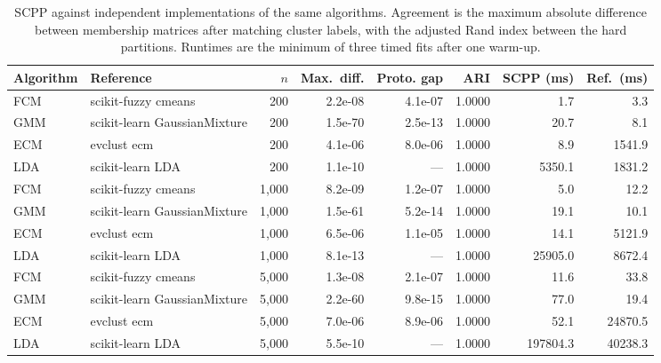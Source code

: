 \begin{table}[t]
\centering
\caption{SCPP against independent implementations of the same algorithms. Agreement is the maximum absolute difference between membership matrices after matching cluster labels, with the adjusted Rand index between the hard partitions. Runtimes are the minimum of three timed fits after one warm-up.}
\label{tab:external-baselines}
\begin{tabular}{llrrrrrr}
\toprule
Algorithm & Reference & $n$ & Max.\ diff. & Proto. gap & ARI & SCPP (ms) & Ref.\ (ms) \\
\midrule
FCM & scikit-fuzzy cmeans & 200 & 2.2e-08 & 4.1e-07 & 1.0000 & 1.7 & 3.3 \\
GMM & scikit-learn GaussianMixture & 200 & 1.5e-70 & 2.5e-13 & 1.0000 & 20.7 & 8.1 \\
ECM & evclust ecm & 200 & 4.1e-06 & 8.0e-06 & 1.0000 & 8.9 & 1541.9 \\
LDA & scikit-learn LDA & 200 & 1.1e-10 & --- & 1.0000 & 5350.1 & 1831.2 \\
FCM & scikit-fuzzy cmeans & 1,000 & 8.2e-09 & 1.2e-07 & 1.0000 & 5.0 & 12.2 \\
GMM & scikit-learn GaussianMixture & 1,000 & 1.5e-61 & 5.2e-14 & 1.0000 & 19.1 & 10.1 \\
ECM & evclust ecm & 1,000 & 6.5e-06 & 1.1e-05 & 1.0000 & 14.1 & 5121.9 \\
LDA & scikit-learn LDA & 1,000 & 8.1e-13 & --- & 1.0000 & 25905.0 & 8672.4 \\
FCM & scikit-fuzzy cmeans & 5,000 & 1.3e-08 & 2.1e-07 & 1.0000 & 11.6 & 33.8 \\
GMM & scikit-learn GaussianMixture & 5,000 & 2.2e-60 & 9.8e-15 & 1.0000 & 77.0 & 19.4 \\
ECM & evclust ecm & 5,000 & 7.0e-06 & 8.9e-06 & 1.0000 & 52.1 & 24870.5 \\
LDA & scikit-learn LDA & 5,000 & 5.5e-10 & --- & 1.0000 & 197804.3 & 40238.3 \\
\bottomrule
\end{tabular}
\end{table}
